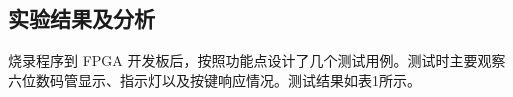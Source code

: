\documentclass[12pt,a4paper,UTF8]{ctexart}
\begin{document}




\subsection{实验结果及分析}

烧录程序到 FPGA 开发板后，按照功能点设计了几个测试用例。测试时主要观察六位数码管显示、指示灯以及按键响应情况。测试结果如表1所示。
\end{document}
